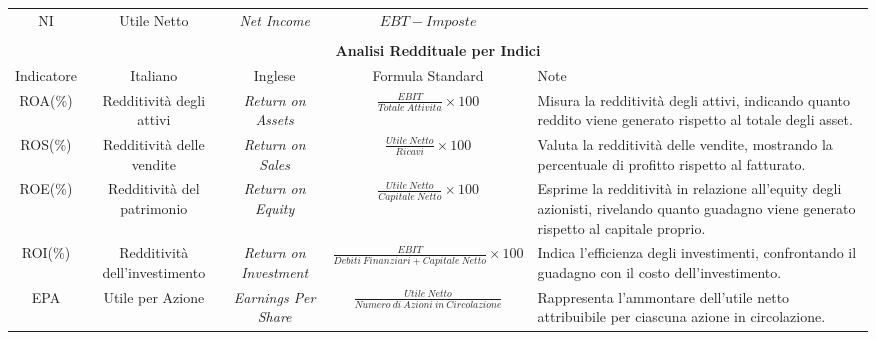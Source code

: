 \documentclass{article}
\newcommand{\roaDesc}{Misura la redditività degli attivi, indicando quanto reddito viene generato rispetto al totale degli asset.}
\newcommand{\roeDesc}{Esprime la redditività in relazione all'equity degli azionisti, rivelando quanto guadagno viene generato rispetto al capitale proprio.}
\newcommand{\rosDesc}{Valuta la redditività delle vendite, mostrando la percentuale di profitto rispetto al fatturato.}
\newcommand{\roiDesc}{Indica l'efficienza degli investimenti, confrontando il guadagno con il costo dell'investimento.}
\newcommand{\upaDesc}{Rappresenta l'ammontare dell'utile netto attribuibile per ciascuna azione in circolazione.}
\begin{document}
\begin{table}[ht]
{\begin{tabular}{|c|c|c|c|l|}
            NI                & Utile Netto                           & \textit{Net Income}                                               & $EBT - Imposte$                                                                       &                       \\
                              &                                       &                                                                   &                                                                                       &                       \\
            \hline
            \hline
            \multicolumn{5}{|c|}{\textbf{Analisi Reddituale per Indici}}                                                                                                                                                                                  \\
            \hline
            Indicatore        & Italiano                              & Inglese                                                           & Formula Standard                                                                      & Note                  \\
            \hline
            ROA(\%)           & Redditività degli attivi              & \textit{Return on Assets}                                         & $\displaystyle\frac{EBIT}{Totale\ Attivita}\times 100$                                & \roaDesc              \\
            ROS(\%)           & Redditività delle vendite             & \textit{Return on Sales}                                          & $\displaystyle\frac{Utile\ Netto}{Ricavi}\times 100$                                  & \rosDesc              \\
            ROE(\%)           & Redditività del patrimonio            & \textit{Return on Equity}                                         & $\displaystyle\frac{Utile\ Netto}{Capitale\ Netto}\times 100$                         & \roeDesc              \\
            ROI(\%)           & Redditività dell'investimento         & \textit{Return on Investment}                                     & $\displaystyle\frac{EBIT}{Debiti\ Finanziari + Capitale\ Netto}\times 100$            & \roiDesc              \\
            EPA               & Utile per Azione                      & \textit{Earnings Per Share}                                       & $\displaystyle\frac{Utile\ Netto}{Numero\ di\ Azioni\ in\ Circolazione}$              & \upaDesc              \\

\end{tabular}}
\end{table}
\end{document}
